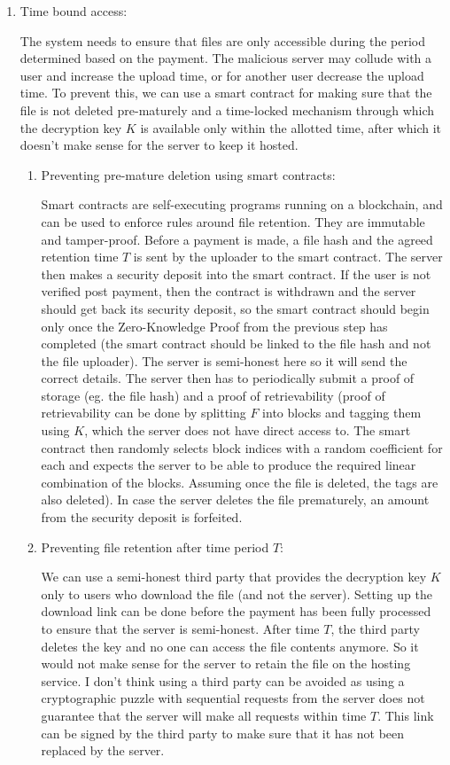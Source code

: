 \documentclass{ashoka-crypto}
\begin{document}
\begin{enumerate}
\item Time bound access:

The system needs to ensure that files are only accessible during the period determined based on the payment. The malicious server may collude with a user and increase the upload time, or for another user decrease the upload time. To prevent this, we can use a smart contract for making sure that the file is not deleted pre-maturely and a time-locked mechanism through which the decryption key $K$ is available only within the allotted time, after which it doesn't make sense for the server to keep it hosted. 

\begin{enumerate}
\item Preventing pre-mature deletion using smart contracts:

Smart contracts are self-executing programs running on a blockchain, and can be used to enforce rules around file retention. They are immutable and tamper-proof. Before a payment is made, a file hash and the agreed retention time $T$ is sent by the uploader to the smart contract. The server then makes a security deposit into the smart contract. If the user is not verified post payment, then the contract is withdrawn and the server should get back its security deposit, so the smart contract should begin only once the Zero-Knowledge Proof from the previous step has completed (the smart contract should be linked to the file hash and not the file uploader). The server is semi-honest here so it will send the correct details. The server then has to periodically submit a proof of storage (eg. the file hash) and a proof of retrievability (proof of retrievability can be done by splitting $F$ into blocks and tagging them using $K$, which the server does not have direct access to. The smart contract then randomly selects block indices with a random coefficient for each and expects the server to be able to produce the required linear combination of the blocks. Assuming once the file is deleted, the tags are also deleted). In case the server deletes the file prematurely, an amount from the security deposit is forfeited.

\item Preventing file retention after time period $T$:

We can use a semi-honest third party that provides the decryption key $K$ only to users who download the file (and not the server). Setting up the download link can be done before the payment has been fully processed to ensure that the server is semi-honest. After time $T$, the third party deletes the key and no one can access the file contents anymore. So it would not make sense for the server to retain the file on the hosting service. I don't think using a third party can be avoided as using a cryptographic puzzle with sequential requests from the server does not guarantee that the server will make all requests within time $T$. This link can be signed by the third party to make sure that it has not been replaced by the server.
\end{enumerate}


\end{enumerate}
\end{document}
